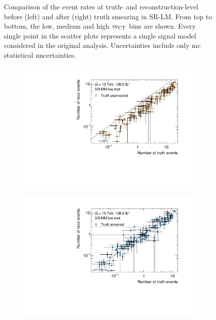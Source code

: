 \begin{figure}
\begin{subfigure}[b]{0.49\linewidth}
	\end{subfigure}
	\caption{Comparison of the event rates at truth- and reconstruction-level before (left) and after (right) truth smearing in SR-LM. From top to bottom, the low, medium and high $m_{\textrm{CT}}$ bins are shown. Every single point in the scatter plots represents a single signal model considered in the original \onelepton analysis. Uncertainties include only \gls{mc} statistical uncertainties.}
	\label{fig:smearing_signal_regions_1}
\end{figure}

\begin{figure}
	\centering
	\begin{subfigure}[b]{0.49\linewidth}
		\centering\includegraphics[width=\textwidth]{yields_SR-MM_low_mct_unsmeared}
	\end{subfigure}\hfill
	\begin{subfigure}[b]{0.49\linewidth}
		\centering\includegraphics[width=\textwidth]{yields_SR-MM_low_mct_smeared}

\end{subfigure}
\end{figure}
